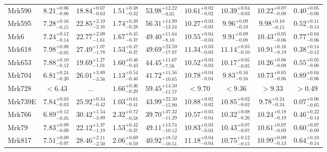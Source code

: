 \documentclass[onecolumn]{mn2e}
\begin{document}
{\begin{center}
\begin{longtable}{lcccccccc}
Mrk590 & $8.21_{-0.06}^{+0.06}$ & $18.84_{-0.63}^{+0.67}$ & $1.51_{-0.32}^{+0.38}$ &$53.98_{-9.05}^{+12.22}$ & $10.61_{-0.02}^{+0.02}$ & $10.39_{-0.03}^{+0.04}$ & $10.22_{-0.08}^{+0.07}$ & $0.40_{-0.06}^{+0.05}$ \\
Mrk595 & $7.28_{-0.15}^{+0.16}$ & $22.85_{-2.16}^{+2.19}$ & $1.74_{-0.28}^{+0.39}$ &$56.31_{-13.24}^{+14.99}$ & $10.27_{-0.03}^{+0.03}$ & $9.96_{-0.10}^{+0.09}$ & $9.98_{-0.15}^{+0.10}$ & $0.52_{-0.14}^{+0.11}$ \\
Mrk6 & $7.24_{-0.14}^{+0.12}$ & $22.77_{-1.61}^{+2.09}$ & $1.67_{-0.37}^{+0.45}$ &$49.40_{-8.10}^{+11.64}$ & $10.55_{-0.03}^{+0.04}$ & $9.91_{-0.08}^{+0.09}$ & $10.43_{-0.06}^{+0.05}$ & $0.77_{-0.06}^{+0.04}$ \\
Mrk618 & $7.98_{-0.05}^{+0.08}$ & $27.49_{-1.78}^{+1.07}$ & $1.53_{-0.37}^{+0.47}$ &$49.69_{-17.87}^{+23.59}$ & $11.34_{-0.03}^{+0.03}$ & $11.14_{-0.10}^{+0.05}$ & $10.91_{-0.19}^{+0.16}$ & $0.38_{-0.12}^{+0.14}$ \\
Mrk653 & $7.88_{-0.12}^{+0.10}$ & $19.69_{-1.01}^{+1.27}$ & $1.60_{-0.43}^{+0.46}$ &$44.45_{-7.56}^{+11.67}$ & $10.52_{-0.03}^{+0.03}$ & $10.17_{-0.05}^{+0.05}$ & $10.26_{-0.08}^{+0.06}$ & $0.55_{-0.06}^{+0.05}$ \\
Mrk704 & $6.81_{-0.20}^{+0.24}$ & $26.01_{-3.56}^{+3.89}$ & $1.13_{-0.46}^{+0.54}$ &$41.72_{-10.65}^{+11.56}$ & $10.78_{-0.04}^{+0.04}$ & $9.83_{-0.16}^{+0.16}$ & $10.73_{-0.06}^{+0.05}$ & $0.89_{-0.06}^{+0.04}$ \\
Mrk728 & $<6.43$ & ... & $1.66_{-0.29}^{+0.36}$ &$59.45_{-11.57}^{+14.50}$ & $<9.70$ & $<9.36$ & $>9.33$ & $>0.49$ \\
Mrk739E & $7.84_{-0.03}^{+0.03}$ & $25.92_{-0.42}^{+0.34}$ & $1.03_{-0.41}^{+0.61}$ &$43.99_{-15.90}^{+22.50}$ & $10.88_{-0.02}^{+0.02}$ & $10.85_{-0.02}^{+0.02}$ & $9.78_{-0.34}^{+0.24}$ & $0.07_{-0.05}^{+0.06}$ \\
Mrk766 & $6.89_{-0.05}^{+0.12}$ & $30.42_{-3.89}^{+1.54}$ & $2.32_{-0.58}^{+0.72}$ &$39.70_{-11.29}^{+37.32}$ & $10.57_{-0.04}^{+0.03}$ & $10.32_{-0.26}^{+0.08}$ & $10.24_{-0.19}^{+0.18}$ & $0.46_{-0.14}^{+0.22}$ \\
Mrk79 & $7.83_{-0.09}^{+0.09}$ & $22.12_{-1.19}^{+1.37}$ & $1.53_{-0.37}^{+0.42}$ &$49.11_{-10.12}^{+13.74}$ & $10.83_{-0.03}^{+0.03}$ & $10.43_{-0.07}^{+0.07}$ & $10.61_{-0.09}^{+0.07}$ & $0.60_{-0.09}^{+0.07}$ \\
Mrk817 & $7.51_{-0.07}^{+0.09}$ & $28.46_{-2.50}^{+2.11}$ & $2.06_{-0.59}^{+0.69}$ &$40.92_{-10.51}^{+18.52}$ & $11.18_{-0.04}^{+0.04}$ & $10.75_{-0.15}^{+0.12}$ & $10.99_{-0.13}^{+0.09}$ & $0.64_{-0.14}^{+0.10}$ \\

\end{longtable}
\end{center}}
\end{document}
